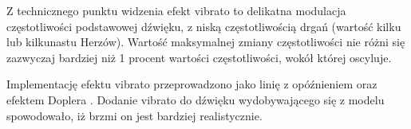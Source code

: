 Z technicznego punktu widzenia efekt vibrato to delikatna modulacja częstotliwości podstawowej dźwięku, z niską częstotliwością drgań (wartość kilku lub kilkunastu Herzów). Wartość maksymalnej zmiany częstotliwości nie różni się zazwyczaj bardziej niż 1 procent wartości częstotliwości, wokół której oscyluje.


Implementację efektu vibrato przeprowadzono jako linię z opóźnieniem oraz efektem Doplera \cite{bowed_3}. Dodanie vibrato do dźwięku wydobywającego się z modelu spowodowało, iż brzmi on jest bardziej realistycznie.